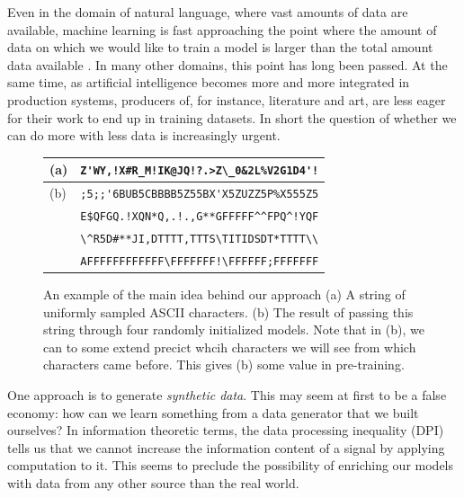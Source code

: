 \documentclass{article} %
\begin{document}
Even in the domain of natural language, where vast amounts of data are available, machine learning is fast approaching the point where the amount of data on which we would like to train a model is larger than the total amount data available \cite{}. In many other domains, this point has long been passed. At the same time, as artificial intelligence becomes more and more integrated in production systems, producers of, for instance, literature and art, are less eager for their work to end up in training datasets. In short the question of whether we can do more with less data is increasingly urgent.
%
\begin{figure}
		\vspace{0em}
        \begin{minipage}{0.55\textwidth}{}
        \begin{tabular}{l l}
			(a) & \lstinline|Z'WY,!X#R_M!IK@JQ!?.>Z\_0&2L%V2G1D4'!| \\
			\hline
			(b) & \lstinline|;5;;'6BUB5CBBBB5Z55BX'X5ZUZZ5P%X555Z5| \\ 
                & \lstinline|E$QFGQ.!XQN*Q,.!.,G**GFFFFF^^FPQ^!YQF| \\
				& \lstinline|\^R5D#**JI,DTTTT,TTTS\TITIDSDT*TTTT\\| \\
				& \lstinline|AFFFFFFFFFFFF\FFFFFFF!\FFFFFF;FFFFFFF| \\
		\end{tabular}
        \end{minipage}

        \caption{An example of the main idea behind our approach (a) A string of uniformly sampled ASCII characters. (b) The result of passing this string through four randomly initialized models. Note that in (b), we can to some extend precict whcih characters we will see from which characters came before. This gives (b) some value in pre-training.}
        \label{fig:example}
        \vspace{-0.5em}
\end{figure}
% 


One approach is to generate \emph{synthetic data}. This may seem at first to be a false economy: how can we learn something from a data generator that we built ourselves? In information theoretic terms, the data processing inequality (DPI) \cite{} tells us that we cannot increase the information content of a signal by applying computation to it. This seems to preclude the possibility of enriching our models with data from any other source than the real world.
\end{document}

